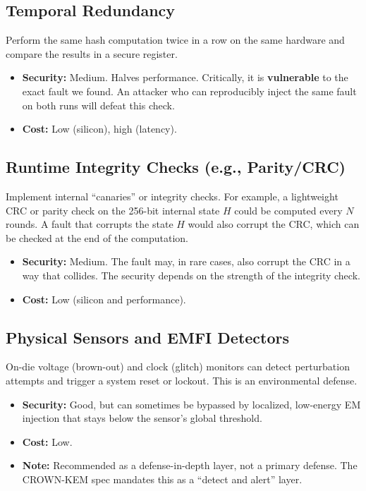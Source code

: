 \documentclass[11pt, a4paper]{article}
\begin{document}
\subsection{Temporal Redundancy}
Perform the same hash computation twice in a row on the same hardware and compare the results in a secure register.
\begin{itemize}
    \item \textbf{Security:} Medium. Halves performance. Critically, it is \textbf{vulnerable} to the exact fault we found. An attacker who can reproducibly inject the same fault on both runs will defeat this check.
    \item \textbf{Cost:} Low (silicon), high (latency).
\end{itemize}

\subsection{Runtime Integrity Checks (e.g., Parity/CRC)}
Implement internal ``canaries'' or integrity checks. For example, a lightweight CRC or parity check on the 256-bit internal state $H$ could be computed every $N$ rounds. A fault that corrupts the state $H$ would also corrupt the CRC, which can be checked at the end of the computation.
\begin{itemize}
    \item \textbf{Security:} Medium. The fault may, in rare cases, also corrupt the CRC in a way that collides. The security depends on the strength of the integrity check.
    \item \textbf{Cost:} Low (silicon and performance).
\end{itemize}

\subsection{Physical Sensors and EMFI Detectors}
On-die voltage (brown-out) and clock (glitch) monitors can detect perturbation attempts and trigger a system reset or lockout. This is an environmental defense.
\begin{itemize}
    \item \textbf{Security:} Good, but can sometimes be bypassed by localized, low-energy EM injection that stays below the sensor's global threshold.
    \item \textbf{Cost:} Low.
    \item \textbf{Note:} Recommended as a defense-in-depth layer, not a primary defense. The CROWN-KEM spec mandates this as a ``detect and alert'' layer.
\end{itemize}
\end{document}
